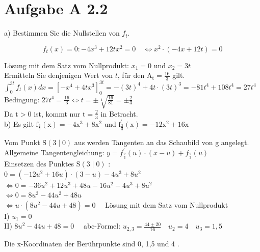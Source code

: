 \documentclass[10pt]{article}
\begin{document}
\section*{Aufgabe A 2.2}
a) Bestimmen Sie die Nullstellen von $f_{t}$.

$$
f_{t}(x)=0:-4 x^{3}+12 t x^{2}=0 \quad \Leftrightarrow x^{2} \cdot(-4 x+12 t)=0
$$

Lösung mit dem Satz vom Nullprodukt: $x_{1}=0$ und $x_{2}=3 t$\\
Ermitteln Sie denjenigen Wert von $t$, für den $\mathrm{A}_{\mathrm{t}}=\frac{16}{3}$ gilt.\\
$\int_{0}^{3 t} f_{t}(x) d x=\left[-x^{4}+4 t x^{3}\right]_{0}^{3 t}=-(3 t)^{4}+4 t \cdot(3 t)^{3}=-81 t^{4}+108 t^{4}=27 t^{4}$\\
Bedingung: $27 t^{4}=\frac{16}{3} \Leftrightarrow t= \pm \sqrt[4]{\frac{16}{81}}= \pm \frac{2}{3}$\\
Da $\mathrm{t}>0$ ist, kommt nur $\mathrm{t}=\frac{2}{3}$ in Betracht.\\
b) Es gilt $\mathrm{f}_{\frac{2}{3}}(\mathrm{x})=-4 \mathrm{x}^{3}+8 \mathrm{x}^{2}$ und $\mathrm{f}_{\frac{2}{3}}^{\prime}(\mathrm{x})=-12 \mathrm{x}^{2}+16 \mathrm{x}$

Vom Punkt $\mathrm{S}(3 \mid 0)$ aus werden Tangenten an das Schaubild von g angelegt.\\
Allgemeine Tangentengleichung: $y=f_{\frac{2}{3}}^{\prime}(u) \cdot(x-u)+f_{\frac{2}{3}}(u)$\\
Einsetzen des Punktes $\mathrm{S}(3 \mid 0)$ :\\
$0=\left(-12 u^{2}+16 u\right) \cdot(3-u)-4 u^{3}+8 u^{2}$\\
$\Leftrightarrow 0=-36 u^{2}+12 u^{3}+48 u-16 u^{2}-4 u^{3}+8 u^{2}$\\
$\Leftrightarrow 0=8 u^{3}-44 u^{2}+48 u$\\
$\Leftrightarrow u \cdot\left(8 u^{2}-44 u+48\right)=0 \quad$ Lösung mit dem Satz vom Nullprodukt\\
I) $u_{1}=0$\\
II) $8 u^{2}-44 u+48=0 \quad$ abc-Formel: $u_{2,3}=\frac{44 \pm 20}{16} \quad u_{2}=4 \quad u_{3}=1,5$

Die x-Koordinaten der Berührpunkte sind 0, 1,5 und 4 .
\end{document}

